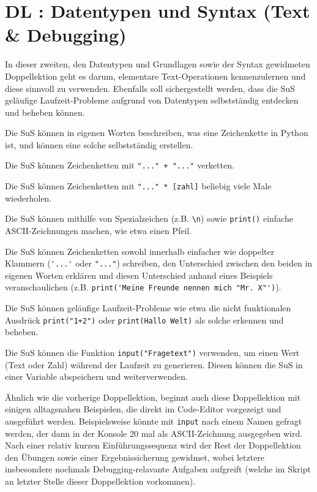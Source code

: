 \section{DL \themycounter: Datentypen und Syntax (Text \& Debugging)}
\begin{myExBox}[title=DL \themycounter]
In dieser zweiten, den Datentypen und Grundlagen sowie der Syntax gewidmeten Doppellektion geht es darum, elementare Text-Operationen kennenzulernen und diese sinnvoll zu verwenden. Ebenfalls soll sichergestellt werden, dass die SuS geläufige Laufzeit-Probleme aufgrund von Datentypen selbstständig entdecken und beheben können.


\begin{todolist}
    \item Die SuS können in eigenen Worten beschreiben, was eine Zeichenkette in Python ist, und können eine solche selbstständig erstellen.
    \item Die SuS können Zeichenketten mit \lstinline|"..." + "..."| verketten.
    \item Die SuS können Zeichenketten mit \lstinline|"..." * [zahl]| beliebig viele Male wiederholen.
    \item Die SuS können mithilfe von Spezialzeichen (z.B. \lstinline|\n|) sowie \lstinline|print()| einfache ASCII-Zeichnungen machen, wie etwa einen Pfeil.
    \item Die SuS können Zeichenketten sowohl innerhalb einfacher wie doppelter Klammern (\lstinline|'...'| oder \lstinline|"..."|) schreiben, den Unterschied zwischen den beiden in eigenen Worten erklären und diesen Unterschied anhand eines Beispiels veranschaulichen (z.B. \lstinline|print('Meine Freunde nennen mich "Mr. X"')|).
    \item Die SuS können geläufige Laufzeit-Probleme wie etwa die nicht funktionalen Ausdrück \lstinline|print("1+2")| oder \lstinline|print(Hallo Welt)| als solche erkennen und beheben.
    \item Die SuS können die Funktion \lstinline|input("Fragetext")| verwenden, um einen Wert (Text oder Zahl) während der Laufzeit zu generieren. Diesen können die SuS in einer Variable abspeichern und weiterverwenden.
\end{todolist}


Ähnlich wie die vorherige Doppellektion, beginnt auch diese Doppellektion mit einigen alltagsnahen Beispielen, die direkt im Code-Editor vorgezeigt und ausgeführt werden. Beispielsweise könnte mit \lstinline|input| nach einem Namen gefragt werden, der dann in der Konsole 20 mal als ASCII-Zeichnung ausgegeben wird. Nach einer relativ kurzen Einführungssequenz wird der Rest der Doppellektion den Übungen sowie einer Ergebnissicherung gewidmet, wobei letztere insbesondere nochmals Debugging-relavante Aufgaben aufgreift (welche im Skript an letzter Stelle dieser Doppellektion vorkommen).


\end{myExBox}
